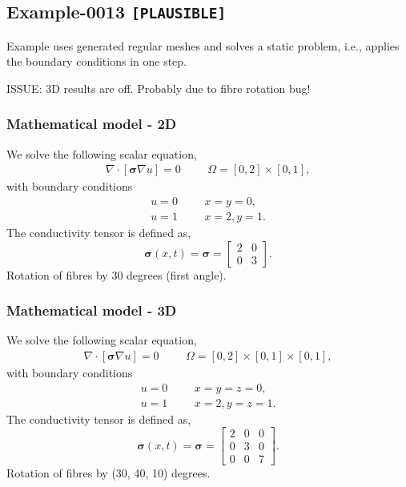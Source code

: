 %
\clearpage
%
\subsection{Example-0013 \texttt{[PLAUSIBLE]}}
%
Example uses generated regular meshes and solves a static problem, i.e., applies
the boundary conditions in one step.

ISSUE: 3D results are off. Probably due to fibre rotation bug!
%
%
\subsubsection{Mathematical model - 2D}
%
We solve the following scalar equation,
%
\begin{align}
    \nabla \cdot [\boldsymbol{\sigma} \nabla u] = 0 & &&\Omega = [0, 2] \times [0, 1],
\end{align}
%
with boundary conditions
%
\begin{align}
    u = 0 & &&x = y = 0, \\
    u = 1 & &&x = 2, y = 1.
\end{align}
%
The conductivity tensor is defined as,
%
\begin{equation}
    \boldsymbol{\sigma} (x, t) = \boldsymbol{\sigma} = \begin{bmatrix} 2 & 0 \\ 0 & 3 \end{bmatrix}.
\end{equation}
%
Rotation of fibres by 30 degrees (first angle).
%
%
\subsubsection{Mathematical model - 3D}
%
We solve the following scalar equation,
%
\begin{align}
    \nabla \cdot [\boldsymbol{\sigma} \nabla u] = 0 & &&\Omega = [0, 2] \times [0, 1] \times [0, 1],
\end{align}
%
with boundary conditions
%
\begin{align}
    u = 0 & &&x = y = z = 0, \\
    u = 1 & &&x = 2, y = z = 1.
\end{align}
%
The conductivity tensor is defined as,
%
\begin{equation}
    \boldsymbol{\sigma} (x, t) = \boldsymbol{\sigma} = \begin{bmatrix} 2 & 0 & 0 \\ 0 & 3 & 0 \\ 0 & 0 & 7 \end{bmatrix}.
\end{equation}
%
Rotation of fibres by (30, 40, 10) degrees.
%
%
